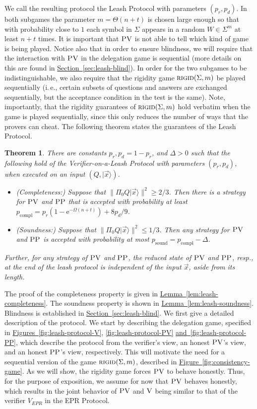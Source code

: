 \documentclass[11pt]{article}
\numberwithin{equation}{section}
\newtheorem{theorem}{Theorem}[section]
\theoremstyle{definition}
\theoremstyle{plain}
\newcommand{\eee}{\mathrm e}
\newcommand{\ie}{i.\,e.}
\newcommand{\expref}[2]{\hyperref[#2]{#1~\ref{#2}}}
\newcommand{\ket}[1]{|#1\rangle}
\DeclareMathOperator{\sound}{sound}
\DeclareMathOperator{\compl}{compl}
\newcommand{\rigid}{\textsc{rigid}}
\newcommand{\ver}{\textsc{V}}
\newcommand{\pv}{\textsc{PV}}
\newcommand{\pp}{\textsc{PP}}
\begin{document}
We call the resulting protocol the Leash Protocol with parameters $(p_r,p_d)$. In both subgames the parameter $m=\Theta(n+t)$ is chosen large enough so that with probability close to $1$ each symbol in $\Sigma$ appears in a random $W\in \Sigma^m$ at least $n+t$ times. It is important that $\pv$ is not able to tell which kind of game is being played. Notice also that in order to ensure blindness, we will require that the interaction with $\pv$ in the delegation game is sequential (more details on this are found in \expref{Section}{sec:leash-blind}). In order for the two subgames to be indistinguishable, we also require that the rigidity game $\rigid(\Sigma,m)$ be played sequentially (\ie, certain subsets of questions and answers are exchanged sequentially, but the acceptance condition in the test is the same). Note, importantly, that the rigidity guarantees of $\rigid(\Sigma,m)$ hold verbatim when the game is played sequentially, since this only reduces the number of ways that the provers can cheat. The following theorem states the guarantees of the Leash Protocol.

\begin{theorem}\label{thm:leash}
There are constants $p_r,p_d=1-p_r$, and $\Delta>0$ such that the following hold of the Verifier-on-a-Leash Protocol with parameters $(p_r,p_d)$, when executed on an input $(Q,\ket{\vec{x}})$.
\begin{itemize}
\item \emph{(Completeness:)} Suppose that $\|\Pi_0 Q\ket{\vec{x}}\|^2 \geq 2/3$. Then there is a strategy for $\pv$ and $\pp$ that is accepted with probability at least $p_{\compl} = p_r(1-\eee^{-\Omega(n+t)})+8p_d/9$. 
\item \emph{(Soundness:)} Suppose that $\|\Pi_0 Q\ket{\vec{x}}\|^2 \leq 1/3$. Then any strategy for $\pv$ and $\pp$ is accepted with probability at most $p_{\sound} = p_{\compl} - \Delta$. 
\end{itemize}
Further, for any strategy of $\pv$ and $\pp$, the reduced state of $\pv$
%
and $\pp$, resp.,  %
at the end of the leash protocol is independent of the input $\vec{x}$, 
aside from its length.
\end{theorem}



The proof of the completeness property is given in \expref{Lemma}{lem:leash-completeness}. The soundness property is shown in \expref{Lemma}{lem:leash-soundness}. Blindness is established in \expref{Section}{sec:leash-blind}. 
We first give a detailed description of the protocol. We start by describing the delegation game, specified in \expref{Figures}{fig:leash-protocol-V}, \ref{fig:leash-protocol-PV} \expref{and}{fig:leash-protocol-PP}, which describe the protocol from the verifier's view, an honest $\pv$'s view, and an honest $\pp$'s
view, respectively. %
This will motivate the need for a sequential version of the game $\rigid(\Sigma,m)$, described in \expref{Figure}{fig:consistency-game}. As we will show, the rigidity game forces $\pv$ to behave honestly. Thus, for the purpose of exposition, we assume for now that $\pv$ behaves honestly, which results in the joint behavior of $\pv$ and $\ver$ being similar to that of the verifier $V_{EPR}$ in the EPR Protocol. 
\end{document}
